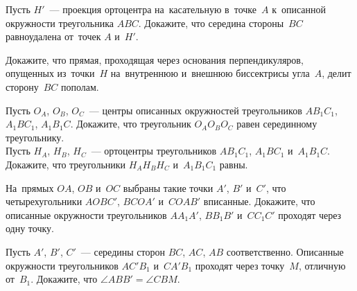\begin{problems}
\item
Пусть $H'$~--- проекция ортоцентра на~касательную в~точке~$A$ к~описанной
окружности треугольника $ABC$.
Докажите, что середина стороны~$BC$ равноудалена от~точек $A$ и~$H'$.

\item
Докажите, что прямая, проходящая через основания перпендикуляров, опущенных
из~точки~$H$ на~внутреннюю и~внешнюю биссектрисы угла~$A$, делит сторону~$BC$
пополам.

\item
\subproblem
Пусть $O_A$, $O_B$, $O_C$~--- центры описанных окружностей треугольников
$A B_1 C_1$, $A_1 B C_1$, $A_1 B_1 C$.
Докажите, что треугольник $O_A O_B O_C$ равен серединному треугольнику.
\\
\subproblem
Пусть $H_A$, $H_B$, $H_C$~--- ортоцентры треугольников
$A B_1 C_1$, $A_1 B C_1$ и~$A_1 B_1 C$.
Докажите, что треугольники $H_A H_B H_C$ и~$A_1 B_1 C_1$ равны.

\item
На~прямых $OA$, $OB$ и~$OC$ выбраны такие точки $A'$, $B'$ и~$C'$, что
четырехугольники $AOBC'$, $BCOA'$ и~$COAB'$ вписанные.
Докажите, что описанные окружности треугольников
$A A_1 A'$, $B B_1 B'$ и~$C C_1 C'$ проходят через одну точку.

\item
Пусть $A'$, $B'$, $C'$~--- середины сторон $BC$, $AC$, $AB$ соответственно.
Описанные окружности треугольников $A C' B_1$ и~$C A' B_1$ проходят через
точку~$M$, отличную от~$B_1$.
Докажите, что $\angle ABB' = \angle CBM$.

\end{problems}

